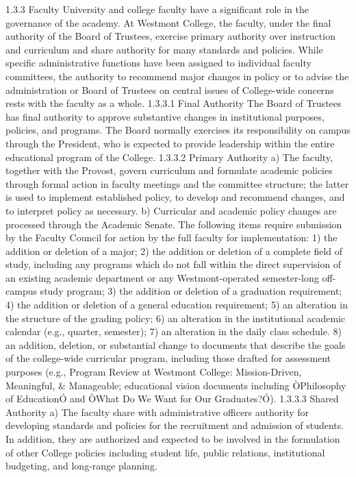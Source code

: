 \documentclass[letterpaper, 11pt]{article}
\begin{document}
1.3.3 Faculty
   University and college faculty have a significant role in the governance of the academy. At Westmont College, the faculty, under the final authority of the Board of Trustees, exercise primary authority over instruction and curriculum and share authority for many standards and policies.  While specific administrative functions have been assigned to individual faculty committees, the authority to recommend major changes in policy or to advise the administration or Board of Trustees on central issues of College-wide concerns rests with the faculty as a whole.
1.3.3.1 Final Authority
   The Board of Trustees has final authority to approve substantive changes in institutional purposes, policies, and programs.  The Board normally exercises its responsibility on campus through the President, who is expected to provide leadership within the entire educational program of the College.
1.3.3.2 Primary Authority
a) The faculty, together with the Provost, govern curriculum and formulate academic policies through formal action in faculty meetings and the committee structure; the latter is used to implement established policy, to develop and recommend changes, and to interpret policy as necessary.
b) Curricular and academic policy changes are processed through the Academic Senate. The following items require submission by the Faculty Council for action by the full faculty for implementation:
1) the addition or deletion of a major;
2) the addition or deletion of a complete field of study, including any programs which do not fall within the direct supervision of an existing academic department or any Westmont-operated semester-long off-campus study program;
3) the addition or deletion of a graduation requirement;
4) the addition or deletion of a general education requirement;
5) an alteration in the structure of the grading policy;
6) an alteration in the institutional academic calendar (e.g., quarter, semester);
7) an alteration in the daily class schedule.
8) an addition, deletion, or substantial change to documents that describe the goals of the college-wide curricular program, including those drafted for assessment purposes (e.g., Program Review at Westmont College: Mission-Driven, Meaningful, & Manageable; educational vision documents including ÒPhilosophy of EducationÓ and ÒWhat Do We Want for Our Graduates?Ó). 
1.3.3.3 Shared Authority
a) The faculty share with administrative officers authority for developing standards and policies for the recruitment and admission of students. In addition, they are authorized and expected to be involved in the formulation of other College policies including student life, public relations, institutional budgeting, and long-range planning.
\end{document}
